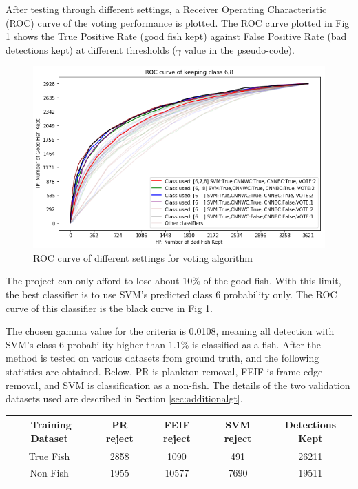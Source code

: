 \documentclass[bsc,frontabs,twoside,fullspacing,parskip,deptreport]{infthesis}
\begin{document}
After testing through different settings, a Receiver Operating Characteristic (ROC) curve of the voting performance is plotted.
The ROC curve plotted in Fig \ref{fig:roccurve} shows the True Positive Rate (good fish kept) against False Positive Rate (bad detections kept) at different thresholds ($\gamma$ value in the pseudo-code).

\begin{figure}[ht]
\centering
    \includegraphics[scale=0.6]{graph/roccurve.png}
    \caption{ROC curve of different settings for voting algorithm}
    \label{fig:roccurve}
\end{figure} 

The project can only afford to lose about 10\% of the good fish.
With this limit, the best classifier is to use SVM's predicted class 6 probability only.
The ROC curve of this classifier is the black curve in Fig \ref{fig:roccurve}. 

The chosen gamma value for the criteria is 0.0108, meaning all detection with SVM's class 6 probability higher than 1.1\% is classified as a fish.
After the method is tested on various datasets from ground truth, and the following statistics are obtained. 
Below, PR is plankton removal, FEIF is frame edge removal, and SVM is classification as a non-fish.
The details of the two validation datasets used are described in Section \ref{sec:additionalgt}.

\begin{center}
\footnotesize
\begin{tabular}{|c|c|c|c|c|}
\hline 
$ $ Training Dataset & PR reject & FEIF reject & SVM reject & Detections Kept\\
\hline 
True Fish & 2858 & 1090 & 491 & 26211 \\
Non Fish & 1955 & 10577 & 7690 & 19511 \\
\hline 
\end{tabular}
\end{center}
\end{document}
